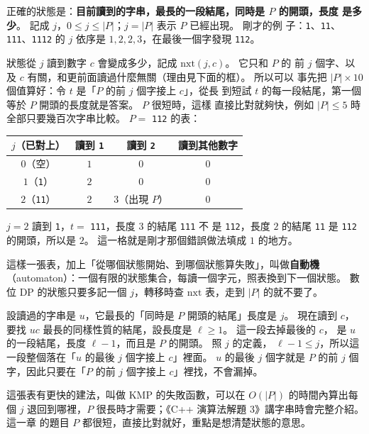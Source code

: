 正確的狀態是：\textbf{目前讀到的字串，最長的一段結尾，同時是 $P$ 的開頭，長度
是多少}。 記成 $j$，$0 \le j \le |P|$；$j = |P|$ 表示 $P$ 已經出現。 剛才的例
子：\texttt{1}、\texttt{11}、\texttt{111}、\texttt{1112} 的 $j$ 依序是
$1, 2, 2, 3$，在最後一個字發現 \texttt{112}。

狀態從 $j$ 讀到數字 $c$ 會變成多少，記成 $\mathrm{nxt}(j, c)$。 它只和 $P$ 的
前 $j$ 個字、以及 $c$ 有關，和更前面讀過什麼無關（理由見下面的框）。 所以可以
事先把 $|P| \times 10$ 個值算好：令 $t$ 是「$P$ 的前 $j$ 個字接上 $c$」，從長
到短試 $t$ 的每一段結尾，第一個等於 $P$ 開頭的長度就是答案。 $P$ 很短時，這樣
直接比對就夠快，例如 $|P| \le 5$ 時全部只要幾百次字串比較。 $P =$ \texttt{112}
的表：

\begin{center}
\begin{tabular}{cccc}
\toprule
$j$（已對上） & 讀到 \texttt{1} & 讀到 \texttt{2} & 讀到其他數字 \\
\midrule
$0$（空） & $1$ & $0$ & $0$ \\
$1$（\texttt{1}） & $2$ & $0$ & $0$ \\
$2$（\texttt{11}） & $2$ & $3$（出現 $P$） & $0$ \\
\bottomrule
\end{tabular}
\end{center}

$j = 2$ 讀到 \texttt{1}，$t = $ \texttt{111}，長度 $3$ 的結尾 \texttt{111} 不
是 \texttt{112}，長度 $2$ 的結尾 \texttt{11} 是 \texttt{112} 的開頭，所以是
$2$。 這一格就是剛才那個錯誤做法填成 $1$ 的地方。

這樣一張表，加上「從哪個狀態開始、到哪個狀態算失敗」，叫做\textbf{自動機}
（automaton）：一個有限的狀態集合，每讀一個字元，照表換到下一個狀態。 數位 DP
的狀態只要多記一個 $j$，轉移時查 $\mathrm{nxt}$ 表，走到 $|P|$ 的就不要了。

\begin{whybox}
設讀過的字串是 $u$，它最長的「同時是 $P$ 開頭的結尾」長度是 $j$。 現在讀到 $c$，
要找 $uc$ 最長的同樣性質的結尾，設長度是 $\ell \ge 1$。 這一段去掉最後的 $c$，
是 $u$ 的一段結尾，長度 $\ell - 1$，而且是 $P$ 的開頭。 照 $j$ 的定義，
$\ell - 1 \le j$，所以這一段整個落在「$u$ 的最後 $j$ 個字接上 $c$」裡面。
$u$ 的最後 $j$ 個字就是 $P$ 的前 $j$ 個字，因此只要在「$P$ 的前 $j$ 個字接上
$c$」裡找，不會漏掉。
\end{whybox}

這張表有更快的建法，叫做 KMP 的失敗函數，可以在 $O(|P|)$ 的時間內算出每個 $j$
退回到哪裡，$P$ 很長時才需要；《C++ 演算法解題 3》講字串時會完整介紹。 這一章
的題目 $P$ 都很短，直接比對就好，重點是想清楚狀態的意思。


